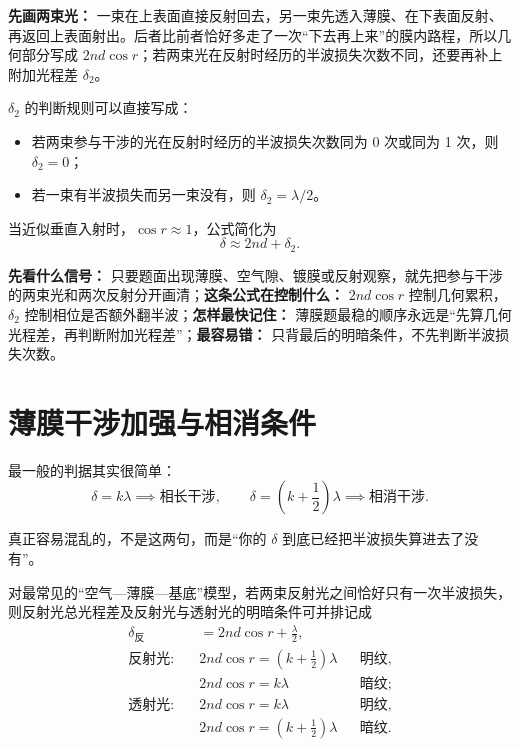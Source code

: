 \documentclass[lang=cn,11pt]{elegantbook}
\begin{document}
\begin{note}
\textbf{先画两束光：} 一束在上表面直接反射回去，另一束先透入薄膜、在下表面反射、再返回上表面射出。后者比前者恰好多走了一次“下去再上来”的膜内路程，所以几何部分写成 \(2nd\cos r\)；若两束光在反射时经历的半波损失次数不同，还要再补上附加光程差 \(\delta_2\)。
\end{note}

\(\delta_2\) 的判断规则可以直接写成：
\begin{itemize}
  \item 若两束参与干涉的光在反射时经历的半波损失次数同为 0 次或同为 1 次，则 \(\delta_2=0\)；
  \item 若一束有半波损失而另一束没有，则 \(\delta_2=\lambda/2\)。
\end{itemize}

当近似垂直入射时，\(\cos r\approx 1\)，公式简化为
\[
\delta\approx 2nd+\delta_2.
\]

\begin{note}
\textbf{先看什么信号：} 只要题面出现薄膜、空气隙、镀膜或反射观察，就先把参与干涉的两束光和两次反射分开画清；\textbf{这条公式在控制什么：} \(2nd\cos r\) 控制几何累积，\(\delta_2\) 控制相位是否额外翻半波；\textbf{怎样最快记住：} 薄膜题最稳的顺序永远是“先算几何光程差，再判断附加光程差”；\textbf{最容易错：} 只背最后的明暗条件，不先判断半波损失次数。
\end{note}

\section{薄膜干涉加强与相消条件}

最一般的判据其实很简单：
\[
\delta=k\lambda \implies \text{相长干涉},\qquad
\delta=\left(k+\frac12\right)\lambda \implies \text{相消干涉}.
\]

真正容易混乱的，不是这两句，而是“你的 \(\delta\) 到底已经把半波损失算进去了没有”。

对最常见的“空气---薄膜---基底”模型，若两束反射光之间恰好只有一次半波损失，则反射光总光程差及反射光与透射光的明暗条件可并排记成
\[
\begin{aligned}
\delta_{\text{反}}&=2nd\cos r+\frac{\lambda}{2},\\
\text{反射光:}\quad
&2nd\cos r=\left(k+\frac12\right)\lambda &&\text{明纹},\\
&2nd\cos r=k\lambda &&\text{暗纹};\\[3pt]
\text{透射光:}\quad
&2nd\cos r=k\lambda &&\text{明纹},\\
&2nd\cos r=\left(k+\frac12\right)\lambda &&\text{暗纹}.
\end{aligned}
\]
\end{document}

